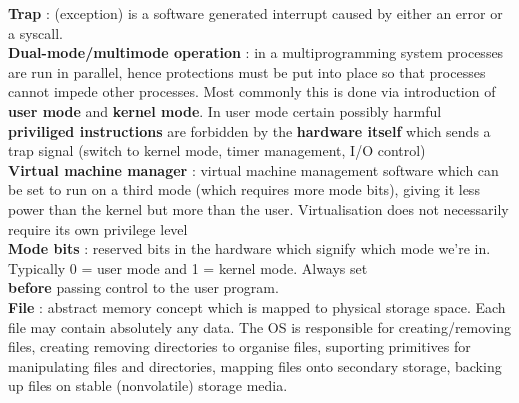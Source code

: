 \documentclass{article}
\begin{document}
{    \textbf{Trap} : (exception) is a software generated interrupt caused by either an error or a syscall. 
    \\

    \textbf{Dual-mode/multimode operation} : in a multiprogramming system processes are run in parallel, hence 
    protections must be put into place so that processes cannot impede other processes. Most commonly 
    this is done via introduction of \textbf{user mode} and \textbf{kernel mode}. In user mode certain possibly harmful \textbf{priviliged instructions} are
    forbidden by the \textbf{hardware itself} which sends a trap signal (switch to kernel mode, timer management, I/O control)
    \\

    \textbf{Virtual machine manager} : virtual machine management software which can be set to run on a third mode (which requires more mode bits), giving it less power 
    than the kernel but more than the user. Virtualisation does not necessarily require its own privilege level 
    \\

    \textbf{Mode bits} : reserved bits in the hardware which signify which mode we're in. Typically 0 = user mode and 1 = kernel mode. Always set 
    \\

    \textbf{before} passing control to the user program.
    \\ 

    \textbf{File} : abstract memory concept which is mapped to physical storage space. Each file may contain 
    absolutely any data. The OS is responsible for creating/removing files, creating removing directories to organise files,
    suporting primitives for manipulating files and directories, mapping files onto secondary storage, backing up files on 
    stable (nonvolatile) storage media.
    
}
\end{document}
